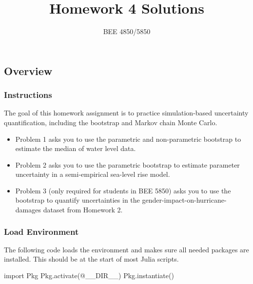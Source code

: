 \documentclass[
  letterpaper,
  DIV=11,
  numbers=noendperiod]{scrartcl}
\title{Homework 4 Solutions}
\subtitle{BEE 4850/5850}
\author{}
\date{}
\newenvironment{Shaded}{\begin{snugshade}}{\end{snugshade}}
\newcommand{\BuiltInTok}[1]{\textcolor[rgb]{0.00,0.23,0.31}{#1}}
\newcommand{\FunctionTok}[1]{\textcolor[rgb]{0.28,0.35,0.67}{#1}}
\newcommand{\ImportTok}[1]{\textcolor[rgb]{0.00,0.46,0.62}{#1}}
\newcommand{\NormalTok}[1]{\textcolor[rgb]{0.00,0.23,0.31}{#1}}
\newcommand{\PreprocessorTok}[1]{\textcolor[rgb]{0.68,0.00,0.00}{#1}}
\providecommand{\tightlist}{%
  \setlength{\itemsep}{0pt}\setlength{\parskip}{0pt}}\usepackage{longtable,booktabs,array}
\begin{document}
\maketitle



\subsection{Overview}\label{overview}

\subsubsection{Instructions}\label{instructions}

The goal of this homework assignment is to practice simulation-based
uncertainty quantification, including the bootstrap and Markov chain
Monte Carlo.

\begin{itemize}
\tightlist
\item
  Problem 1 asks you to use the parametric and non-parametric bootstrap
  to estimate the median of water level data.
\item
  Problem 2 asks you to use the parametric bootstrap to estimate
  parameter uncertainty in a semi-empirical sea-level rise model.
\item
  Problem 3 (only required for students in BEE 5850) asks you to use the
  bootstrap to quantify uncertainties in the
  gender-impact-on-hurricane-damages dataset from Homework 2.
\end{itemize}

\subsubsection{Load Environment}\label{load-environment}

The following code loads the environment and makes sure all needed
packages are installed. This should be at the start of most Julia
scripts.

\begin{Shaded}
\begin{Highlighting}[]
\ImportTok{import} \BuiltInTok{Pkg}
\BuiltInTok{Pkg}\NormalTok{.}\FunctionTok{activate}\NormalTok{(}\PreprocessorTok{@\_\_DIR\_\_}\NormalTok{)}
\BuiltInTok{Pkg}\NormalTok{.}\FunctionTok{instantiate}\NormalTok{()}
\end{Highlighting}
\end{Shaded}
\end{document}
